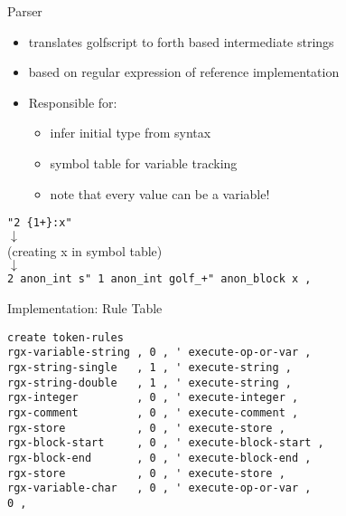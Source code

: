 \documentclass{beamer}
\begin{document}
\begin{frame}
    Parser
    \begin{itemize}
        \item translates golfscript to forth based intermediate strings
        \item based on regular expression of reference implementation 
        \item Responsible for:
        \begin{itemize}
            \item infer initial type from syntax
            \item symbol table for variable tracking
            \item note that every value can be a variable!
        \end{itemize}
    \end{itemize}



\begin{center}
    \small{    
\texttt{"2 \{1+\}:x"}  \\
$\downarrow$ \\
(creating x in symbol table) \\
$\downarrow$ \\
\texttt{2 anon\_int s" 1 anon\_int golf\_+" anon\_block x , }
}
\end{center}

\end{frame}


\begin{frame}[fragile]

  \vspace{0.5cm}
Implementation: Rule Table
    \small
\begin{verbatim}
create token-rules
rgx-variable-string , 0 , ' execute-op-or-var , 
rgx-string-single   , 1 , ' execute-string ,    
rgx-string-double   , 1 , ' execute-string ,    
rgx-integer         , 0 , ' execute-integer ,   
rgx-comment         , 0 , ' execute-comment ,   
rgx-store           , 0 , ' execute-store ,     
rgx-block-start     , 0 , ' execute-block-start ,  
rgx-block-end       , 0 , ' execute-block-end ,  
rgx-store           , 0 , ' execute-store ,     
rgx-variable-char   , 0 , ' execute-op-or-var , 
0 ,
\end{verbatim}


\end{frame}
\end{document}
